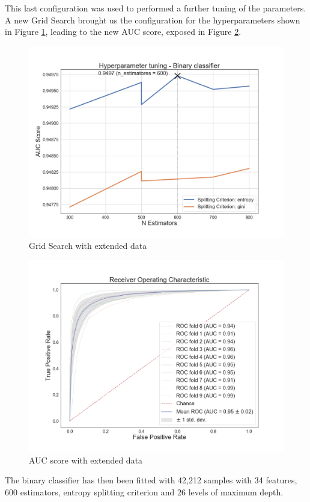 This last configuration was used to performed a further tuning of the parameters.
A new Grid Search brought us the configuration for the hyperparameters shown in Figure  \ref{fig:bon_tuning_refil}, leading to the new AUC score, exposed in Figure \ref{fig:bon_refil_auc}.
\begin{figure}[htp!]
	\centering
	\includegraphics[width=\columnwidth]{chapter5/figure/bon_tuning_refill.png}
	\caption{Grid Search with extended data}
	\label{fig:bon_tuning_refil}
\end{figure}
\begin{figure}[htp!]
	\centering
	\includegraphics[width=\columnwidth]{chapter5/figure/refill_auc.png}
	\caption{AUC score with extended data}
	\label{fig:bon_refil_auc}
\end{figure}
The binary classifier has then been fitted with 42,212 samples with 34 features, 600 estimators, entropy splitting criterion and 26 levels of maximum depth.

